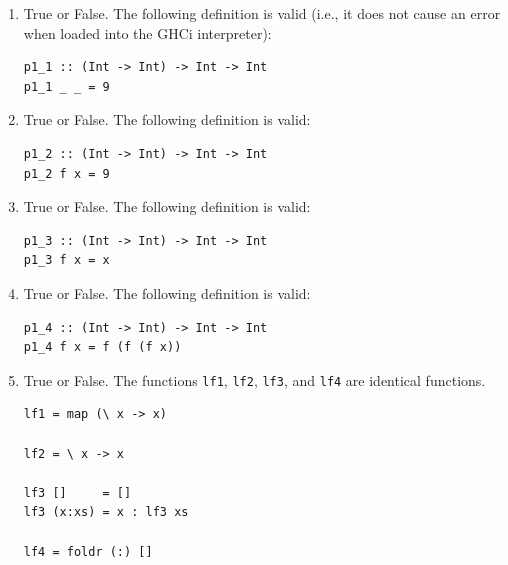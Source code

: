 \documentclass[12pt]{article}
\begin{document}
\begin{enumerate}[resume]
\item True or False. The following definition is valid (i.e., it does not cause an error
when loaded into the GHCi interpreter):
\begin{verbatim}
p1_1 :: (Int -> Int) -> Int -> Int
p1_1 _ _ = 9
\end{verbatim}
\item True or False. The following definition is valid:
\begin{verbatim}
p1_2 :: (Int -> Int) -> Int -> Int
p1_2 f x = 9
\end{verbatim}
\item True or False. The following definition is valid:
\begin{verbatim}
p1_3 :: (Int -> Int) -> Int -> Int
p1_3 f x = x
\end{verbatim}
\item True or False. The following definition is valid:
\begin{verbatim}
p1_4 :: (Int -> Int) -> Int -> Int
p1_4 f x = f (f (f x))
\end{verbatim}

\item True or False. The functions \verb+lf1+, \verb+lf2+, \verb+lf3+, and \verb+lf4+ are identical functions.
\begin{verbatim}
lf1 = map (\ x -> x)

lf2 = \ x -> x

lf3 []     = []
lf3 (x:xs) = x : lf3 xs

lf4 = foldr (:) []
\end{verbatim}
\end{enumerate}

\pagebreak
\end{document}
